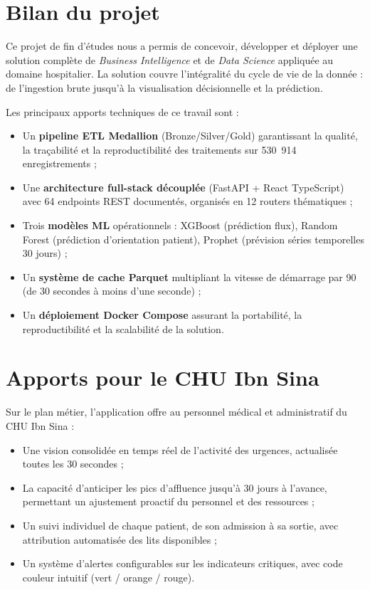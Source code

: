 \documentclass[12pt,a4paper]{report}
\begin{document}
	\section*{Bilan du projet}
	
	Ce projet de fin d'études nous a permis de concevoir, développer et déployer une solution
	complète de \textit{Business Intelligence} et de \textit{Data Science} appliquée au domaine
	hospitalier. La solution couvre l'intégralité du cycle de vie de la donnée : de l'ingestion
	brute jusqu'à la visualisation décisionnelle et la prédiction.
	
	Les principaux apports techniques de ce travail sont :
	
	\begin{itemize}
		\item Un \textbf{pipeline ETL Medallion} (Bronze/Silver/Gold) garantissant la qualité,
		la traçabilité et la reproductibilité des traitements sur 530~914 enregistrements ;
		\item Une \textbf{architecture full-stack découplée} (FastAPI + React TypeScript) avec
		64 endpoints REST documentés, organisés en 12 routers thématiques ;
		\item Trois \textbf{modèles ML} opérationnels : XGBoost (prédiction flux), Random Forest
		(prédiction d'orientation patient), Prophet (prévision séries temporelles 30 jours) ;
		\item Un \textbf{système de cache Parquet} multipliant la vitesse de démarrage par 90
		(de 30 secondes à moins d'une seconde) ;
		\item Un \textbf{déploiement Docker Compose} assurant la portabilité, la reproductibilité
		et la scalabilité de la solution.
	\end{itemize}
	
	\section*{Apports pour le CHU Ibn Sina}
	
	Sur le plan métier, l'application offre au personnel médical et administratif du CHU Ibn Sina :
	
	\begin{itemize}
		\item Une vision consolidée en temps réel de l'activité des urgences, actualisée toutes
		les 30 secondes ;
		\item La capacité d'anticiper les pics d'affluence jusqu'à 30 jours à l'avance, permettant
		un ajustement proactif du personnel et des ressources ;
		\item Un suivi individuel de chaque patient, de son admission à sa sortie, avec attribution
		automatisée des lits disponibles ;
		\item Un système d'alertes configurables sur les indicateurs critiques, avec code couleur
		intuitif (vert / orange / rouge).
	\end{itemize}
	
\end{document}
